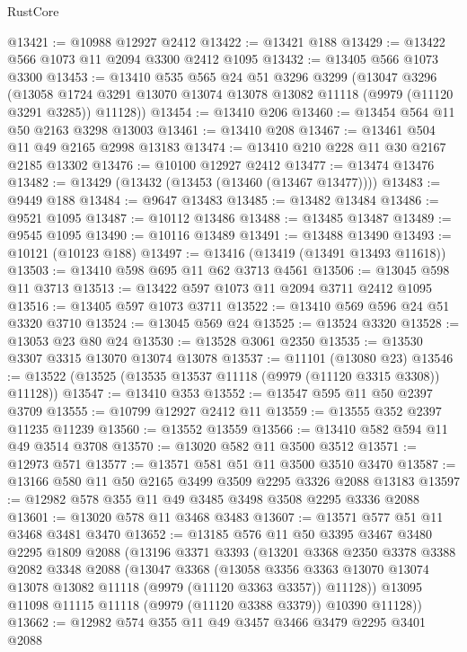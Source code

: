\begin{lexlean}{RustCore}
\begin{coremodule}
@13421 := @10988 @12927 @2412
@13422 := @13421 @188
@13429 := @13422 @566 @1073 @11 @2094 @3300 @2412 @1095
@13432 := @13405 @566 @1073 @3300
@13453 := @13410
    @535
    @565
    @24
    @51
    @3296
    @3299
    (@13047
      @3296
      (@13058 @1724 @3291 @13070 @13074 @13078 @13082 @11118 (@9979 (@11120 @3291 @3285)) @11128))
@13454 := @13410 @206
@13460 := @13454 @564 @11 @50 @2163 @3298 @13003
@13461 := @13410 @208
@13467 := @13461 @504 @11 @49 @2165 @2998 @13183
@13474 := @13410 @210 @228 @11 @30 @2167 @2185 @13302
@13476 := @10100 @12927 @2412
@13477 := @13474 @13476
@13482 := @13429 (@13432 (@13453 (@13460 (@13467 @13477))))
@13483 := @9449 @188
@13484 := @9647 @13483
@13485 := @13482 @13484
@13486 := @9521 @1095
@13487 := @10112 @13486
@13488 := @13485 @13487
@13489 := @9545 @1095
@13490 := @10116 @13489
@13491 := @13488 @13490
@13493 := @10121 (@10123 @188)
@13497 := @13416 (@13419 (@13491 @13493 @11618))
@13503 := @13410 @598 @695 @11 @62 @3713 @4561
@13506 := @13045 @598 @11 @3713
@13513 := @13422 @597 @1073 @11 @2094 @3711 @2412 @1095
@13516 := @13405 @597 @1073 @3711
@13522 := @13410 @569 @596 @24 @51 @3320 @3710
@13524 := @13045 @569 @24
@13525 := @13524 @3320
@13528 := @13053 @23 @80 @24
@13530 := @13528 @3061 @2350
@13535 := @13530 @3307 @3315 @13070 @13074 @13078
@13537 := @11101 (@13080 @23)
@13546 := @13522 (@13525 (@13535 @13537 @11118 (@9979 (@11120 @3315 @3308)) @11128))
@13547 := @13410 @353
@13552 := @13547 @595 @11 @50 @2397 @3709
@13555 := @10799 @12927 @2412 @11
@13559 := @13555 @352 @2397 @11235 @11239
@13560 := @13552 @13559
@13566 := @13410 @582 @594 @11 @49 @3514 @3708
@13570 := @13020 @582 @11 @3500 @3512
@13571 := @12973 @571
@13577 := @13571 @581 @51 @11 @3500 @3510 @3470
@13587 := @13166 @580 @11 @50 @2165 @3499 @3509 @2295 @3326 @2088 @13183
@13597 := @12982 @578 @355 @11 @49 @3485 @3498 @3508 @2295 @3336 @2088
@13601 := @13020 @578 @11 @3468 @3483
@13607 := @13571 @577 @51 @11 @3468 @3481 @3470
@13652 := @13185
    @576
    @11
    @50
    @3395
    @3467
    @3480
    @2295
    @1809
    @2088
    (@13196
      @3371
      @3393
      (@13201
        @3368
        @2350
        @3378
        @3388
        @2082
        @3348
        @2088
        (@13047
          @3368
          (@13058
            @3356
            @3363
            @13070
            @13074
            @13078
            @13082
            @11118
            (@9979 (@11120 @3363 @3357))
            @11128))
        @13095
        @11098
        @11115
        @11118
        (@9979 (@11120 @3388 @3379))
        @10390
        @11128))
@13662 := @12982 @574 @355 @11 @49 @3457 @3466 @3479 @2295 @3401 @2088

\end{coremodule}
\end{lexlean}
